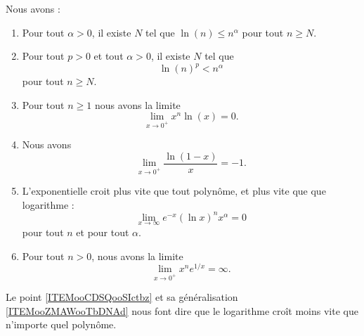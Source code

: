 \begin{proposition}     \label{PROPooKVIFooGdKpfP}
	Nous avons :
	\begin{enumerate}
		\item   \label{ITEMooCDSQooSIctbz}
		      Pour tout \( \alpha>0\), il existe \( N\) tel que \( \ln(n)\leq n^{\alpha}\) pour tout \( n\geq N\).
		\item       \label{ITEMooZMAWooTbDNAd}
		      Pour tout \( p>0\) et tout \( \alpha>0\), il existe \( N\) tel que
		      \begin{equation}
			      \ln(n)^p<n^{\alpha}
		      \end{equation}
		      pour tout \( n\geq N\).
		\item       \label{ITEMooBLNOooZQNTfd}
		      Pour tout \( n\geq 1\) nous avons la limite
		      \begin{equation}
			      \lim_{x\to 0^+} x^n\ln(x)=0.
		      \end{equation}
		\item       \label{ITEMooMLNMooAyJTox}
		      Nous avons
		      \begin{equation}
			      \lim_{x\to 0^+} \frac{ \ln(1-x) }{ x }=-1.
		      \end{equation}
		\item       \label{ITEMooIQEKooBionsK}
		      L'exponentielle croit plus vite que tout polynôme, et plus vite que que logarithme :
		      \begin{equation}        \label{EqExpDecrtPlusVite}
			      \lim_{x\to\infty} e^{-x}(\ln x)^{n}x^{\alpha}=0
		      \end{equation}
		      pour tout \( n\) et pour tout \( \alpha\).
		\item       \label{ITEMooDUQWooNvAvmR}
		      Pour tout \( n>0\), nous avons la limite
		      \begin{equation}
			      \lim_{x\to 0^+} x^n e^{1/x}=\infty.
		      \end{equation}
	\end{enumerate}
\end{proposition}

Le point \ref{ITEMooCDSQooSIctbz} et sa généralisation \ref{ITEMooZMAWooTbDNAd} nous font dire que le logarithme croît moins vite que n'importe quel polynôme.

